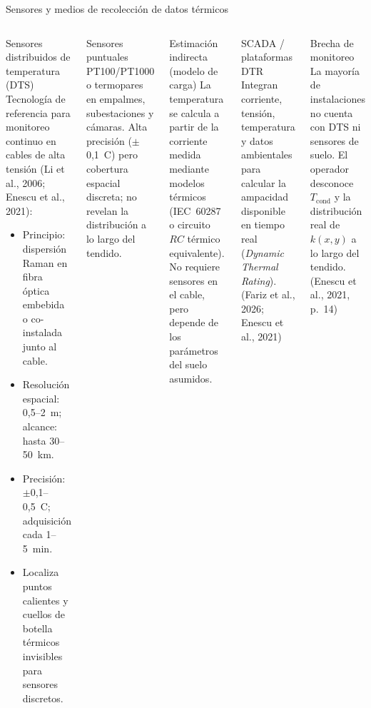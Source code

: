 \documentclass[aspectratio=169]{beamer}
\newcommand{\refcite}[1]{{\footnotesize\color{gray!70!black} #1}}
\begin{document}
\begin{frame}{Sensores y medios de recolección de datos térmicos}
\begin{columns}[T]
\begin{block}{Sensores distribuidos de temperatura (DTS)}
\scriptsize\justifying
Tecnología de referencia para monitoreo continuo en cables de alta
tensión \refcite{(Li et al., 2006; Enescu et al., 2021)}:
\begin{itemize}[leftmargin=*,itemsep=1pt]
    \item Principio: dispersión Raman en fibra óptica embebida o
          co-instalada junto al cable.
    \item Resolución espacial: 0{,}5--2~m; alcance: hasta 30--50~km.
    \item Precisión: $\pm$0{,}1--0{,}5~\textdegree{}C; adquisición cada
          1--5~min.
    \item Localiza puntos calientes y cuellos de botella térmicos
          invisibles para sensores discretos.
\end{itemize}
\end{block}
\vspace{0.2em}
\begin{block}{Sensores puntuales}
\scriptsize
PT100/PT1000 o termopares en empalmes, subestaciones y cámaras.
Alta precisión ($\pm$0{,}1~\textdegree{}C) pero cobertura espacial
discreta; no revelan la distribución a lo largo del tendido.
\end{block}

\begin{block}{Estimación indirecta (modelo de carga)}
\scriptsize
La temperatura se calcula a partir de la corriente medida mediante
modelos térmicos (IEC~60287 o circuito $RC$ térmico equivalente). No
requiere sensores en el cable, pero depende de los parámetros del suelo
asumidos.
\end{block}
\vspace{0.2em}
\begin{block}{SCADA / plataformas DTR}
\scriptsize
Integran corriente, tensión, temperatura y datos ambientales para
calcular la ampacidad disponible en tiempo real
(\textit{Dynamic Thermal Rating}).
\refcite{(Fariz et al., 2026; Enescu et al., 2021)}
\end{block}
\vspace{0.2em}
\begin{alertblock}{Brecha de monitoreo}
\scriptsize
La mayoría de instalaciones no cuenta con DTS ni sensores de suelo.
El operador desconoce $T_\text{cond}$ y la distribución real de
$k(x,y)$ a lo largo del tendido.
\refcite{(Enescu et al., 2021, p.~14)}
\end{alertblock}
\end{columns}
\end{frame}
\end{document}
